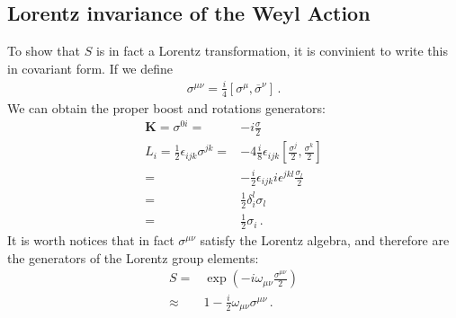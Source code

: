 \subsection{Lorentz invariance of the Weyl Action}

\begin{frame}
To show that $S$ is in fact a Lorentz transformation, it is convinient to write this in covariant form. If we define
\begin{align}
  \sigma^{\mu\nu}=\frac{i}{4}\left[\sigma^\mu,\overline{\sigma}^\nu\right]\,.
\end{align}
We can obtain the proper boost and rotations generators:
\begin{align*}
 \boldsymbol{K}= \sigma^{0i}=&-i\frac{\sigma}{2}\nonumber\\
 L_{i}=\frac{1}{2}\epsilon_{ijk}\sigma^{jk}=&-4\frac{i}{8}\epsilon_{ijk}\left[\frac{\sigma^j}{2},\frac{\sigma^k}{2}  \right]\nonumber\\
=&-\tfrac{i}{2}\epsilon_{ijk}i\epsilon^{jkl}\frac{\sigma_l}{2}\nonumber\\
=&\tfrac{1}{2}\delta_i^l\sigma_l\nonumber\\
=&\tfrac{1}{2}\sigma_i\,.
\end{align*}
It is worth notices that in fact $\sigma^{\mu\nu}$ satisfy the Lorentz algebra, and therefore are the generators of the Lorentz group elements:
\begin{align}
  S=&\exp\left(-i \omega_{\mu\nu}\frac{\sigma^{\mu\nu}}{2}\right)\nonumber\\
  \approx&1-\frac{i}{2} \omega_{\mu\nu}{\sigma^{\mu\nu}}\,.
\end{align}



\end{frame}

